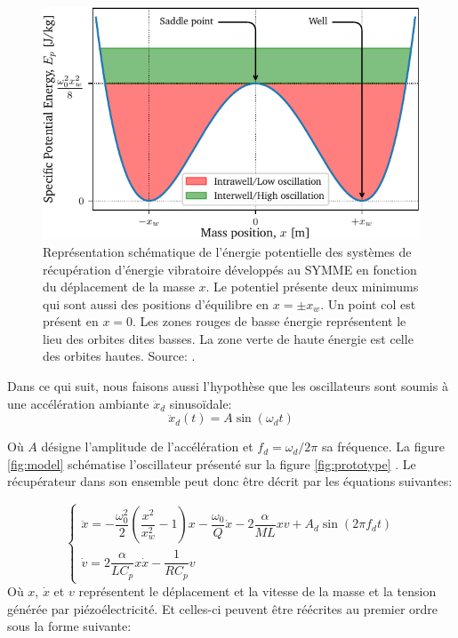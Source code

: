 \documentclass[a4paper, french, 12pt, titlepage]{article}
\begin{document}
\begin{figure}
  \begin{center}
    \includegraphics[width = .6\textwidth]{images/potential}
  \end{center}
  \caption{Représentation schématique de l'énergie potentielle des systèmes de récupération d'énergie vibratoire développés au SYMME en fonction du déplacement de la masse $x$.
    Le potentiel présente deux minimums qui sont aussi des positions d'équilibre en $x = \pm x_w$.
    Un point col est présent en $x = 0$.
    Les zones rouges de basse énergie représentent le lieu des orbites dites basses.
    La zone verte de haute énergie est celle des orbites hautes.  Source:  \cite{lcharleuxHDR}.}
  \label{fig:lc_potential}
\end{figure}

Dans ce qui suit, nous faisons aussi l'hypothèse que les oscillateurs sont soumis à une accélération ambiante $\ddot x_d$ sinusoïdale:
\begin{equation}
  \ddot x_d(t) = A \sin (\omega_d t)
\end{equation}

\noindent Où $A$ désigne l'amplitude de l'accélération et $f_d = \omega_d / 2 \pi$ sa fréquence.
La figure \ref{fig:model} schématise l'oscillateur présenté sur la figure \ref{fig:prototype} \cite{csaintmartin2023preprint}.
Le récupérateur dans son ensemble peut donc être décrit par les équations suivantes:

\begin{equation}
  \left\{
  \begin{array}{ll}
    \ddot{x} = -\dfrac{\omega_0^2}{2} \left( \dfrac{x^2}{x_w^2} - 1 \right) x - \dfrac{\omega_0}{Q} \dot{x} - 2 \dfrac{\alpha}{M L} x v + A_d \sin(2 \pi f_d t) \\[5mm]
    \dot{v} =   2 \dfrac{\alpha}{LC_p} x \dot{x} - \dfrac{1}{R C_p} v
  \end{array}
  \right.
  \label{eq:ode}
\end{equation}
Où $x$, $\dot{x}$ et $v$ représentent le déplacement et la vitesse de la masse et la tension générée par piézoélectricité.
\noindent Et celles-ci peuvent être réécrites au premier ordre sous la forme suivante:
\end{document}
